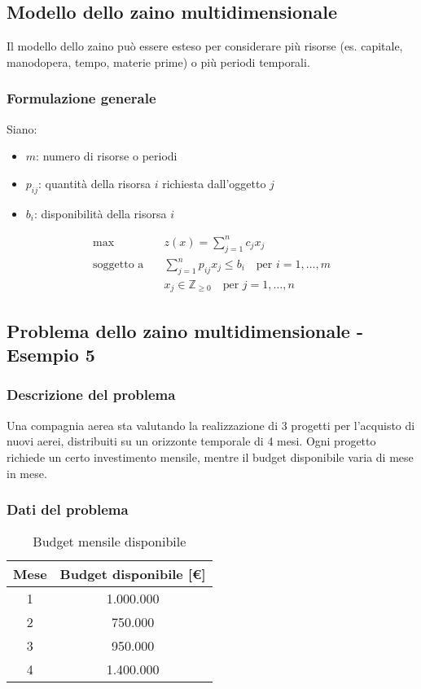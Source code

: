 \subsection{Modello dello zaino multidimensionale}
Il modello dello zaino può essere esteso per considerare più risorse 
(es. capitale, manodopera, tempo, materie prime) o più periodi temporali.

\subsubsection{Formulazione generale}
Siano:
\begin{itemize}
    \item $m$: numero di risorse o periodi
    \item $p_{ij}$: quantità della risorsa $i$ richiesta dall'oggetto $j$
    \item $b_i$: disponibilità della risorsa $i$
\end{itemize}

\[
\begin{aligned}
\max \quad & z(x) = \sum_{j=1}^{n} c_j x_j \\
\text{soggetto a} \quad & \sum_{j=1}^{n} p_{ij} x_j \leq b_i \quad \text{per } i = 1, \dots, m \\
& x_j \in \mathbb{Z}_{\geq 0} \quad \text{per } j = 1, \dots, n
\end{aligned}
\]

\subsection{Problema dello zaino multidimensionale - Esempio 5}
\subsubsection{Descrizione del problema}
Una compagnia aerea sta valutando la realizzazione di 3 progetti per l'acquisto 
di nuovi aerei, distribuiti su un orizzonte temporale di 4 mesi. Ogni 
progetto richiede un certo investimento mensile, mentre il budget disponibile 
varia di mese in mese.

\subsubsection{Dati del problema}
\begin{table}[htbp]
    \centering
    \caption{Budget mensile disponibile}
    \begin{tabular}{|c|c|}
        \hline
        \textbf{Mese} & \textbf{Budget disponibile [€]} \\
        \hline
        1 & 1.000.000 \\
        2 & 750.000 \\
        3 & 950.000 \\
        4 & 1.400.000 \\
        \hline
    \end{tabular}
\end{table}


